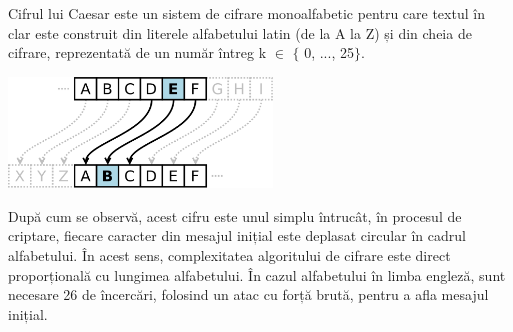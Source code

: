 \documentclass{article}
\begin{document}
Cifrul lui Caesar este un sistem de cifrare monoalfabetic pentru care textul în clar este construit din literele alfabetului latin (de la A la Z) și din cheia de cifrare, reprezentată de un număr întreg k $ \in $  $ \{ $ 0, ..., 25$ \} $.

\vspace{0.3cm}
\begin{center}
    \label{fig:1}
    \captionsetup{justification=centering,margin=1cm}
\end{center}
\vspace{0.3cm}

\begin{center}
    \label{fig:2}
    \captionsetup{justification=centering,margin=1cm}
\end{center}
\vspace{0.3cm}

\begin{center}
    \includegraphics[width=7cm]{images/caesar.png}
    \label{fig:2}
    \captionsetup{justification=centering,margin=1cm}
\end{center}
\vspace{0.3cm}

După cum se observă, acest cifru este unul simplu întrucât, în procesul de criptare, fiecare caracter din mesajul inițial este deplasat circular în cadrul alfabetului. În acest sens, complexitatea algoritului de cifrare este direct proporțională cu lungimea alfabetului. În cazul alfabetului în limba engleză, sunt necesare 26 de încercări, folosind un atac cu forță brută, pentru a afla mesajul inițial.
\end{document}
